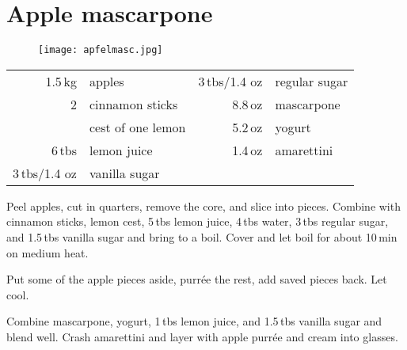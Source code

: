 \section{Apple mascarpone}
\begin{figure}[H]
  \centering
  \texttt{[image: apfelmasc.jpg]}
\end{figure}
\begin{centering}
\end{centering}
\begin{table}[H]
\centering
\begin{tabular*}{1\textwidth}{rlrl}
1.5\,kg & apples & 3\,tbs/1.4 oz & regular sugar \\
2 & cinnamon sticks & 8.8\,oz & mascarpone \\
& cest of one lemon & 5.2\,oz & yogurt \\
6\,tbs & lemon juice & 1.4\,oz & amarettini \\
3\,tbs/1.4 oz & vanilla sugar & & \\
\end{tabular*}
\end{table}

\begin{Notes}

\item Peel apples, cut in quarters, remove the core, and slice into pieces. Combine with cinnamon sticks, lemon cest, 5\,tbs lemon juice, 4\,tbs water, 3\,tbs regular sugar, and 1.5\,tbs vanilla sugar and bring to a boil. Cover and let boil for about 10\,min on medium heat.

\item Put some of the apple pieces aside, purr\'{e}e the rest, add saved pieces back. Let cool.

\item Combine mascarpone, yogurt, 1\,tbs lemon juice, and 1.5\,tbs vanilla sugar and blend well. Crash amarettini and layer with apple purr\'{e}e and cream into glasses.
\end{Notes}
\newpage

